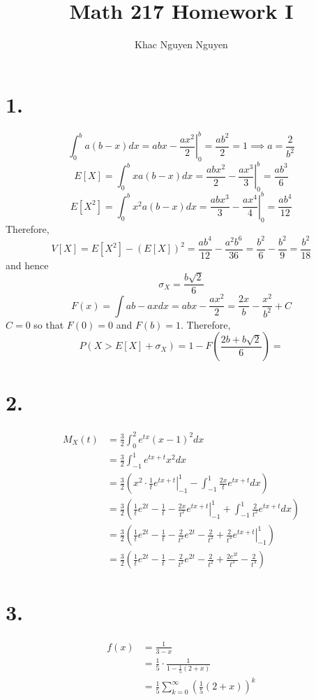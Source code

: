 \documentclass[11pt]{article}
\title{\textbf{Math 217 Homework I}}
\author{Khac Nguyen Nguyen}
\date{}
\begin{document}
\section*{1.}
\[
    \int_0^b a(b-x) dx = \left.abx-\frac{ax^2}{2} \right|_0^b = \frac{ab^2}{2} = 1 \implies a = \frac{2}{b^2}
\]
\[
    E[X] = \int_0^b xa(b-x) dx = \left.\frac{abx^2}{2}- \frac{ax^3}{3} \right|_0^b = \frac{ab^3}{6} 
\]
\[
    E[X^2] = \int_0^b x^2a(b-x) dx = \left.\frac{abx^3}{3}- \frac{ax^4}{4} \right|_0^b = \frac{ab^4}{12}     
\]
Therefore, 
\[
    V[X] = E[X^2] - (E[X])^2 =  \frac{ab^4}{12} - \frac{a^2b^6}{36} = \frac{b^2}{6} - \frac{b^2}{9} = \frac{b^2}{18}  
\]
and hence 
\[
    \sigma_X = \frac{b\sqrt{2}}{6}    
\]
\[
    F(x) = \int ab-ax dx = abx - \frac{ax^2}{2} = \frac{2x}{b} - \frac{x^2}{b^2} + C      
\]
$C = 0$ so that $F(0) = 0$ and $F(b) = 1$. 
Therefore, 
\[
    P(X>E[X] + \sigma_X) = 1-F\left(\frac{2b + b\sqrt{2}}{6}\right) =     
\]
\pagebreak
\section*{2.}
\begin{equation*}
    \begin{aligned}
        M_X(t) 
        &= \frac{3}{2} \int_0^2 e^{tx} (x-1)^2 dx \\
        &= \frac{3}{2} \int_{-1}^1 e^{tx+t} x^2 dx \\
        &= \frac{3}{2} \left( \left. x^2 \cdot \frac{1}{t} e^{tx+t} \right|_{-1}^1 - \int_{-1}^1 \frac{2x}{t} e^{tx+t} dx \right)\\
        &= \frac{3}{2} \left( \frac{1}{t} e^{2t} - \frac{1}{t} - \left. \frac{2x}{t^2} e^{tx+t} \right|_{-1}^1 + \int_{-1}^1 \frac{2}{t^2} e^{tx+t} dx  \right)\\
        &= \frac{3}{2} \left( \frac{1}{t} e^{2t} - \frac{1}{t} - \frac{2}{t^2} e^{2t} - \frac{2}{t^2} + \left. \frac{2}{t^3} e^{tx+t} \right|_{-1}^1 \right) \\
        &= \frac{3}{2} \left( \frac{1}{t} e^{2t} - \frac{1}{t} - \frac{2}{t^2} e^{2t} - \frac{2}{t^2} + \frac{2e^{2t}}{t^3} - \frac{2}{t^3} \right) 
    \end{aligned}
\end{equation*}
\pagebreak
\section*{3.}
\begin{equation*}
    \begin{aligned}
        f(x) &= \frac{1}{3-x} \\
        &= \frac{1}{5} \cdot \frac{1}{1-\frac{1}{5}(2+x)} \\
        &= \frac{1}{5} \sum_{k=0}^\infty \left(\frac{1}{5}(2+x)\right)^k
    \end{aligned}
\end{equation*}
\pagebreak
\end{document}
